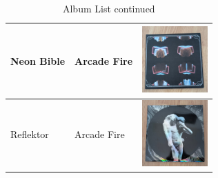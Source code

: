\begin{table}[h]
\begin{tabular}{|m{4cm}|m{4cm}|m{4cm}|}
        \hline
        Neon Bible & Arcade Fire & \includegraphics[width=2.5cm]{figures/test_albums/Neon Bible.jpg} \\
        \hline
        Reflektor & Arcade Fire & \includegraphics[width=2.5cm]{figures/test_albums/Reflektor.jpg} \\
        \hline
    \end{tabular}
    \caption{Album List continued}
    \label{tab:albums-list2}
\end{table}

